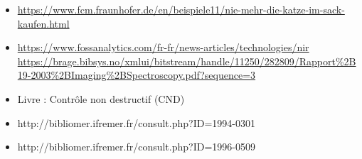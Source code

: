 \documentclass[12pt,a4paper]{article}
\begin{document}
\begin{itemize}
	\item \href{https://www.fcm.fraunhofer.de/en/beispiele11/nie-mehr-die-katze-im-sack-kaufen.html}{https://www.fcm.fraunhofer.de/en/beispiele11/nie-mehr-die-katze-im-sack-kaufen.html}
	\item \href{https://www.fossanalytics.com/fr-fr/news-articles/technologies/nir}{https://www.fossanalytics.com/fr-fr/news-articles/technologies/nir}
	\href{https://brage.bibsys.no/xmlui/bitstream/handle/11250/282809/Rapport\%2B19-2003\%2BImaging\%2BSpectroscopy.pdf?sequence=3}{https://brage.bibsys.no/xmlui/bitstream/handle/11250/282809/Rapport\%2B19-2003\%2BImaging\%2BSpectroscopy.pdf?sequence=3}
	\item Livre : Contrôle non destructif (CND)
	
	\item http://bibliomer.ifremer.fr/consult.php?ID=1994-0301
	
	\item http://bibliomer.ifremer.fr/consult.php?ID=1996-0509
	
\end{itemize}
\end{document}
